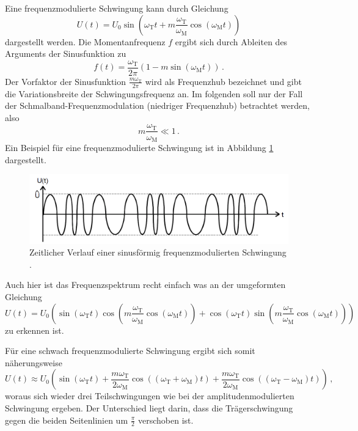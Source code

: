 Eine frequenzmodulierte Schwingung kann durch Gleichung
\begin{equation*}
    U(t) = U_\text{0} \sin{\left( \omega_\text{T} t + m \frac{\omega_\text{T}}{\omega_\text{M}} \cos{\left(\omega_\text{M} t\right)} \right)}
\end{equation*}
dargestellt werden.
Die Momentanfrequenz $f$ ergibt sich durch Ableiten des Arguments der Sinusfunktion zu
\begin{equation*}
    f(t) = \frac{\omega_\text{T}}{2 \pi} ( 1 - m \sin{\left(\omega_\text{M} t\right)}) \,.
\end{equation*}
Der Vorfaktor der Sinusfunktion $\frac{m \omega_\text{T}}{2 \pi}$ wird als Frequenzhub bezeichnet und gibt die Variationsbreite der Schwingungsfrequenz an.
Im folgenden soll nur der Fall der Schmalband-Frequenzmodulation (niedriger Frequenzhub) betrachtet werden, also 
\begin{equation*}
    m \frac{\omega_\text{T}}{\omega_\text{M}} \ll 1\,.
\end{equation*}
Ein Beispiel für eine frequenzmodulierte Schwingung ist in Abbildung \ref{fm:modulation} dargestellt.

\begin{figure}[!h]
    \centering
    \includegraphics[width = 14cm]{images/fm-modulation.png}
    \caption{Zeitlicher Verlauf einer sinusförmig frequenzmodulierten Schwingung \cite{V59}.}
    \label{fm:modulation}
\end{figure}

Auch hier ist das Frequenzspektrum recht einfach was an der umgeformten Gleichung
\begin{equation*}
    U(t) = U_\text{0} \left( \sin{\left( \omega_\text{T} t \right) }\cos{\left(m\frac{\omega_\text{T}}{\omega_\text{M}} \cos{\left(\omega_\text{M} t\right)}\right)} + \cos{\left(\omega_\text{T} t\right)}\sin{\left(m\frac{\omega_\text{T}}{\omega_\text{M}} \cos{\left(\omega_\text{M} t\right)}\right)} \right)
\end{equation*}
zu erkennen ist.

Für eine schwach frequenzmodulierte Schwingung ergibt sich somit näherungsweise
\begin{equation}
    U(t) \approx U_\text{0} \left( \sin{\left(\omega_\text{T} t\right)} + \frac{m \omega_\text{T}}{2 \omega_\text{M}} \cos{\left((\omega_\text{T} + \omega_\text{M}) t\right)} + \frac{m \omega_\text{T}}{2 \omega_\text{M}} \cos{\left((\omega_\text{T} - \omega_\text{M}) t\right)}\right) \,, \label{fm:kleiner_hub}
\end{equation}
woraus sich wieder drei Teilschwingungen wie bei der amplitudenmodulierten Schwingung ergeben.
Der Unterschied liegt darin, dass die Trägerschwingung gegen die beiden Seitenlinien um $\frac{\pi}{2}$ verschoben ist.

